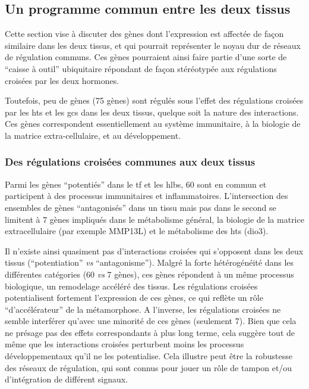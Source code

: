 \documentclass[../main.tex]{subfiles}
\begin{document}
	\subsection{Un programme commun entre les deux tissus}
		Cette section vise à discuter des gènes dont l'expression est affectée de façon similaire dans les deux tissus, et qui pourrait représenter le noyau dur de réseaux de régulation communs.
		Ces gènes pourraient ainsi faire partie d'une sorte de ``caisse à outil'' ubiquitaire répondant de façon stéréotypée aux régulations croisées par les deux hormones.
		\par
		Toutefois, peu de gènes (75 gènes) sont régulés sous l'effet des régulations croisées par les \glspl{ht} et les \glspl{gc} dans les deux tissus, quelque soit la nature des interactions.
		Ces gènes correspondent essentiellement au système immunitaire, à la biologie de la matrice extra-cellulaire, et au développement.

		\subsubsection{Des régulations croisées communes aux deux tissus}
			Parmi les gènes ``potentiés'' dans le \gls{tf} et les \glspl{hlb}, 60 sont en commun et participent à des processus immunitaires et inflammatoires.
			L'intersection des ensembles de gènes ``antagonisés'' dans un tissu mais pas dans le second se limitent à 7 gènes impliqués dans le métabolisme général, la biologie de la matrice extracellulaire (par exemple MMP13L) et le métabolisme des \glspl{ht} (\gls{dio3}).
			\par
			Il n'existe ainsi quasiment pas d'interactions croisées qui s'opposent dans les deux tissus (``potentiation'' \textit{vs} ``antagonisme'').
			Malgré la forte hétérogénéité dans les différentes catégories (60 \textit{vs} 7 gènes), ces gènes répondent à un même processus biologique, un remodelage accéléré des tissus.
			Les régulations croisées potentialisent fortement l'expression de ces gènes, ce qui reflète un rôle ``d'accélérateur'' de la métamorphose.
			A l'inverse, les régulations croisées ne semble interférer qu'avec une minorité de ces gènes (seulement 7).
			Bien que cela ne présage pas des effets correspondants à plus long terme, cela suggère tout de même que les interactions croisées perturbent moins les processus développementaux qu'il ne les potentialise.
			Cela illustre peut être la robustesse des réseaux de régulation, qui sont connus pour jouer un rôle de tampon et/ou d'intégration de différent signaux.
\end{document}
